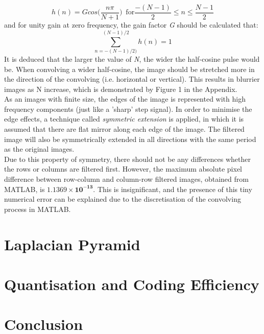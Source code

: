 \documentclass[a4paper, 11pt]{article}
\begin{document}
\begin{equation*}
\mathit{h(n) = G cos \big( \frac{n \pi}{N+1} \big)} \, \, \, \mathrm{for} \mathit{\frac{-(N-1)}{2} \leq n \leq \frac{N-1}{2}}
\end{equation*}
\noindent
and for unity gain at zero frequency, the gain factor \textit{G} should be calculated that:
\begin{equation*}
\sum\limits_{n=-(N-1)/2)}^{(N-1)/2} h(n) = 1
\end{equation*}
\noindent
It is deduced that the larger the value of \textit{N}, the wider the half-cosine pulse would be. When convolving a wider half-cosine, the image should be stretched more in the direction of the convolving (i.e. horizontal or vertical). This results in blurrier images as N increase, which is demonstrated by Figure 1 in the Appendix. \\
\noindent
As an images with finite size, the edges of the image is represented with high frequency components (just like a 'sharp' step signal). In order to minimise the edge effects, a technique called \textit{symmetric extension} is applied, in which it is assumed that there are flat mirror along each edge of the image. The filtered image will also be symmetrically extended in all directions with the same period as the original images. \\
\noindent
Due to this property of symmetry, there should not be any differences whether the rows or columns are filtered first. However, the maximum absolute pixel difference between row-column and column-row filtered images, obtained from MATLAB, is $\mathbf{1.1369\times10^{-13}}$. This is insignificant, and the presence of this tiny numerical error can be explained due to the discretisation of the convolving process in MATLAB. 
\section{Laplacian Pyramid}

\section{Quantisation and Coding Efficiency}

\section{Conclusion}
\end{document}
